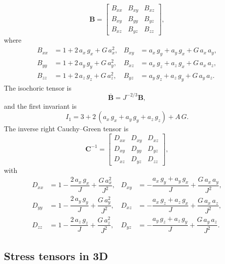 \documentclass[11pt,a4paper]{article}
\begin{document}
%
\begin{equation}
\boxed{
\textbf{B}=
\begin{bmatrix}
B_{xx}&B_{xy}&B_{xz}\\
B_{xy}&B_{yy}&B_{yz}\\
B_{xz}&B_{yz}&B_{zz}
\end{bmatrix}
},
\end{equation}
%
where
%
\begin{align}
B_{xx}&=1+2\,a_x\,g_x+G\,a_x^2,
&B_{xy}&=a_x\,g_y+a_y\,g_x+G\,a_x\,a_y,
\\
B_{yy}&=1+2\,a_y\,g_y+G\,a_y^2,
&B_{xz}&=a_x\,g_z+a_z\,g_x+G\,a_x\,a_z,
\\
B_{zz}&=1+2\,a_z\,g_z+G\,a_z^2,
&B_{yz}&=a_y\,g_z+a_z\,g_y+G\,a_y\,a_z.
\end{align}
%
The isochoric tensor is
%
\begin{equation}
\boxed{\overline{\textbf{B}}=J^{-2/3}\textbf{B}},
\end{equation}
%
and the first invariant is
%
\begin{equation}
\boxed{I_1=3+2\,(a_x\,g_x+a_y\,g_y+a_z\,g_z)+A\,G}.
\end{equation}
%
The inverse right Cauchy--Green tensor is
%
\begin{equation}
\boxed{
\textbf{C}^{-1}=
\begin{bmatrix}
D_{xx}&D_{xy}&D_{xz}\\
D_{xy}&D_{yy}&D_{yz}\\
D_{xz}&D_{yz}&D_{zz}
\end{bmatrix}
},
\end{equation}
%
with
%
\begin{align}
D_{xx}&=1-\dfrac{2\,a_x\,g_x}{J}+\dfrac{G\,a_x^2}{J^2},
&D_{xy}&=-\dfrac{a_x\,g_y+a_y\,g_x}{J}+\dfrac{G\,a_x\,a_y}{J^2},
\\
D_{yy}&=1-\dfrac{2\,a_y\,g_y}{J}+\dfrac{G\,a_y^2}{J^2},
&D_{xz}&=-\dfrac{a_x\,g_z+a_z\,g_x}{J}+\dfrac{G\,a_x\,a_z}{J^2},
\\
D_{zz}&=1-\dfrac{2\,a_z\,g_z}{J}+\dfrac{G\,a_z^2}{J^2},
&D_{yz}&=-\dfrac{a_y\,g_z+a_z\,g_y}{J}+\dfrac{G\,a_y\,a_z}{J^2}.
\end{align}

\subsection{Stress tensors in 3D}
\end{document}
